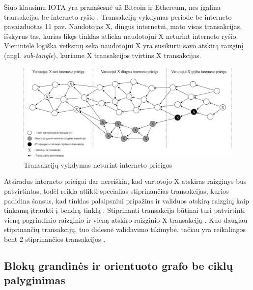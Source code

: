 Šiuo klausimu IOTA yra pranašesnė už Bitcoin ir Ethereum, nes įgalina transakcijas be interneto ryšio \cite{zivic2019distributed}. Transakcijų vykdymas periode be interneto pavaizduotas 11 pav. Naudotojas X, dingus internetui, mato visas transakcijas, išskyrus tas, kurias likęs tinklas atlieka naudotojui X neturint interneto ryšio. Vienintelė logiška veiksmų seka naudotojui X yra susikurti savo atskirą raizginį (angl. \textit{sub-tangle}), kuriame X transakcijos tvirtins X transakcijas.

\begin{figure}[H]
    \centering
    \includegraphics[scale=0.6]{images/offline-tangle}
    \caption{Transakcijų vykdymas neturint interneto prieigos}
\end{figure}

Atsiradus interneto prieigai dar nereiškia, kad vartotojo X atskiras raizginys bus patvirtintas, todėl reikia atlikti specialias stiprinančias transakcijas, kurios padidina šansus, kad tinklas palaipsniui pripažins ir validuos atskirą raizginį kaip tinkamą įtraukti į bendrą tinklą \cite{bennet2017technical}. Stiprinanti transakcija būtinai turi patvirtinti vieną pagrindinio raizginio ir vieną atskiro raizginio X transakciją \cite{bennet2017technical}. Kuo daugiau stiprinančių transakcijų, tuo didesnė validavimo tikimybė, tačiau yra reikalingos bent 2 stiprinančios transakcijos \cite{bennet2017technical}.




\subsection{Blokų grandinės ir orientuoto grafo be ciklų palyginimas}

